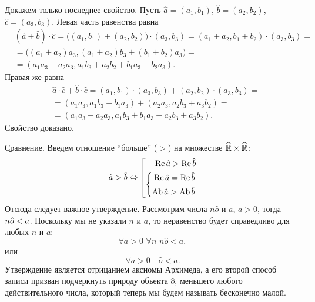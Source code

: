 Докажем только последнее свойство. Пусть $\hat{a}=(a_1, b_1)$, $\hat{b}=(a_2, b_2)$, $\hat{c}=(a_3, b_3)$. Левая часть равенства равна
\begin{eqnarray*}
	& (\hat{a}+\hat{b})\cdot\hat{c}=\big((a_1, b_1)+(a_2, b_2)\big)\cdot(a_3, b_3)=(a_1+a_2, b_1+b_2)\cdot(a_3, b_3)= \\
	& =\big((a_1+a_2)a_3, (a_1+a_2)b_3+(b_1+b_2)a_3\big) = \\
	& =(a_1a_3+a_2a_3, a_1b_3+a_2b_2+b_1a_3+b_2a_3).
\end{eqnarray*}
Правая же равна
\begin{eqnarray*}
	& \hat{a}\cdot\hat{c}+\hat{b}\cdot\hat{c}=(a_1, b_1)\cdot(a_3, b_3)+(a_2, b_2)\cdot(a_3, b_3)= \\
	& =(a_1a_3, a_1b_3+b_1a_3)+(a_2a_3, a_2b_3+a_3b_2)= \\
	& =(a_1a_3+a_2a_3, a_1b_3+b_1a_3+a_2b_3+a_3b_2).
\end{eqnarray*}
Свойство доказано.

\b{Сравнение.} Введем отношение ``больше'' ($>$) на множестве $\widehat{\mathbb{R}}\times\widehat{\mathbb{R}}$:
	\begin{equation}
	\hat{a}>\hat{b}
	  \Leftrightarrow
		\left[
			\begin{aligned}
				\operatorname{Re} \hat{a}>\operatorname{Re} \hat{b} \\
				\left\{
					\begin{aligned}
						\operatorname{Re} \hat{a}=\operatorname{Re} \hat{b} \\
						\operatorname{Ab} \hat{a}>\operatorname{Ab} \hat{b}
					\end{aligned}
				\right.
			\end{aligned}
		\right.
	\end{equation}
Отсюда следует важное утверждение. Рассмотрим числа $n\hat{o}$ и $a$, $a>0$, тогда $n\hat{o}\hm<a$. Поскольку мы не указали $n$ и $a$, то неравенство будет справедливо для любых $n$ и $a$:
	$$\forall a>0 \,\, \forall n \,\, n\hat{o}<a,$$
или
	$$\forall a>0 \quad \hat{o}<a. $$
Утверждение является отрицанием аксиомы Архимеда, а его второй способ записи призван подчеркнуть природу объекта $\hat{o}$, меньшего любого действительного числа, который теперь мы будем называть бесконечно малой.

